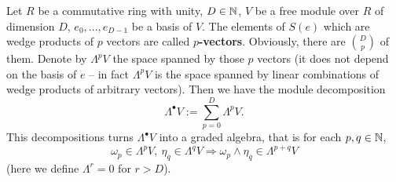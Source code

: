 \begin{remark}
   Let
    $R$ be a commutative ring with unity,
    $D \in \mathbb{N}$,
    $V$ be a free module over $R$ of dimension $D$,
    $e_0, ..., e_{D - 1}$ be a basis of $V$.
  The elements of $S(e)$ which are wedge products of $p$ vectors are called
  \textbf{$p$-vectors}.
  Obviously, there are $\binom{D}{p}$ of them.
  Denote by $\Lambda^p V$ the space spanned by those $p$ vectors
  (it does not depend on the basis of $e$ -- in fact $\Lambda^p V$ is the space
  spanned by linear combinations of wedge products of arbitrary vectors).
  Then we have the module decomposition
  \begin{equation}
    \Lambda^\bullet V := \sum_{p = 0}^D \Lambda^p V.
  \end{equation}
  This decompositions turns $\Lambda^\bullet V$ into a graded algebra, that is
  for each $p, q \in \mathbb{N}$,
  \begin{equation}
    \omega_p \in \Lambda^p V,\ \eta_q \in \Lambda^q V
    \Rightarrow \omega_p \wedge \eta_q \in \Lambda^{p + q} V
  \end{equation}
  (here we define $\Lambda^r = 0$ for $r > D$).
\end{remark}
